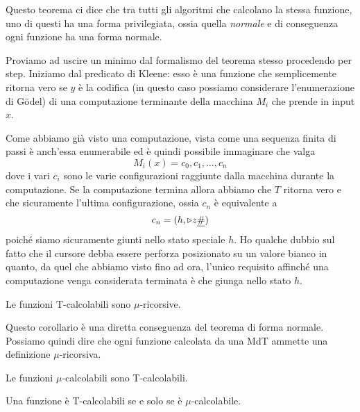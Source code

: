 Questo teorema ci dice che tra tutti gli algoritmi che calcolano
la stessa funzione, uno di questi ha una forma privilegiata,
ossia quella \emph{normale} e di conseguenza ogni funzione ha
una forma normale.

Proviamo ad uscire un minimo dal formalismo del teorema stesso
procedendo per step. Iniziamo dal predicato di Kleene: esso è
una funzione che semplicemente ritorna vero se $y$ è la codifica
(in questo caso possiamo considerare l'enumerazione di G\"odel)
di una computazione terminante della macchina $M_i$ che prende
in input $x$.

Come abbiamo già visto una computazione, vista come una sequenza
finita di passi è anch'essa enumerabile ed è quindi possibile
immaginare che valga
\[ M_i (x) = c_0, c_1, \dots, c_n \]
dove i vari $c_i$ sono le varie configurazioni raggiunte dalla
macchina durante la computazione. Se la computazione termina
allora abbiamo che $T$ ritorna vero e che sicuramente l'ultima
configurazione, ossia $c_n$ è equivalente a
\[ c_n = (h, \triangleright z \underline{\#}) \]
poiché siamo sicuramente giunti nello stato speciale $h$. Ho
qualche dubbio sul fatto che il cursore debba essere perforza
posizionato su un valore bianco in quanto, da quel che abbiamo
visto fino ad ora, l'unico requisito affinché una computazione
venga considerata terminata è che giunga nello stato $h$.

\begin{theorem}
	Le funzioni T-calcolabili sono $\mu$-ricorsive.
\end{theorem}

Questo corollario è una diretta conseguenza del teorema di
forma normale. Possiamo quindi dire che ogni funzione calcolata
da una MdT ammette una definizione $\mu$-ricorsiva.

\begin{lemma}
	Le funzioni $\mu$-calcolabili sono T-calcolabili.
\end{lemma}

\begin{theorem}
	Una funzione è T-calcolabili se e solo se è
	$\mu$-calcolabile.
\end{theorem}
